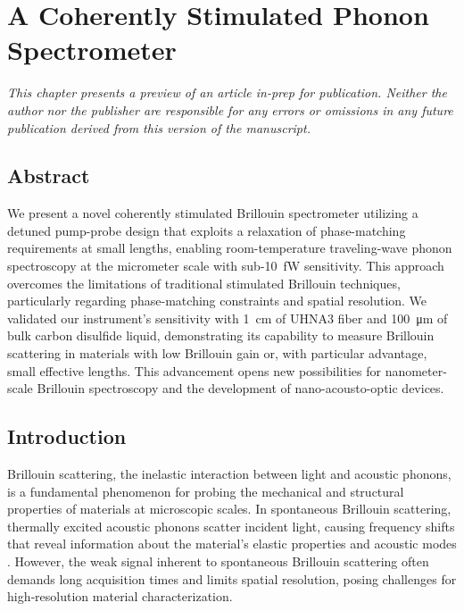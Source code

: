 \setcounter{rownumber}{0}
\chapter{A Coherently Stimulated Phonon Spectrometer}
\label{ch:CoBS}
\acresetall

\hfill

\textit{This chapter presents a preview of an article in-prep for publication. Neither the author nor the publisher are responsible for any errors or omissions in any future publication derived from this version of the manuscript.}

\doublespacing

\section{Abstract}
We present a novel coherently stimulated Brillouin spectrometer utilizing a detuned pump-probe design that exploits a relaxation of phase-matching requirements at small lengths, enabling room-temperature traveling-wave phonon spectroscopy at the micrometer scale with sub-\SI{10}{\femto\watt} sensitivity. This approach overcomes the limitations of traditional stimulated Brillouin techniques, particularly regarding phase-matching constraints and spatial resolution. We validated our instrument’s sensitivity with \SI{1}{\centi\meter} of \ac{UHNA3} fiber and \SI{100}{\micro\meter} of bulk carbon disulfide liquid, demonstrating its capability to measure Brillouin scattering in materials with low Brillouin gain or, with particular advantage, small effective lengths. This advancement opens new possibilities for nanometer-scale Brillouin spectroscopy and the development of nano-acousto-optic devices.

\section{Introduction}
\label{sec:Introduction}

Brillouin scattering, the inelastic interaction between light and acoustic phonons, is a fundamental phenomenon for probing the mechanical and structural properties of materials at microscopic scales. In spontaneous Brillouin scattering, thermally excited acoustic phonons scatter incident light, causing frequency shifts that reveal information about the material’s elastic properties and acoustic modes \cite{boyd2020nonlinear}. However, the weak signal inherent to spontaneous Brillouin scattering often demands long acquisition times and limits spatial resolution, posing challenges for high‐resolution material characterization.

